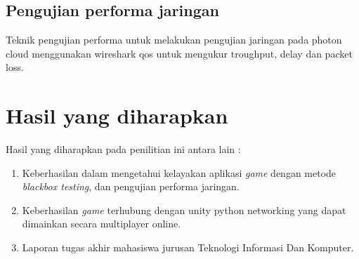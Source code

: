 \subsection{Pengujian performa jaringan}
Teknik pengujian performa untuk melakukan pengujian jaringan pada photon cloud menggunakan wireshark qos untuk mengukur troughput, delay dan packet loss.
\section{Hasil yang diharapkan}
Hasil yang diharapkan pada penilitian ini antara lain :
\begin{enumerate}
    \item Keberhasilan dalam mengetahui kelayakan aplikasi \textit{game} dengan metode \textit{blackbox testing}, dan pengujian performa jaringan.
    \item Keberhasilan \textit{game} terhubung dengan unity python networking yang dapat dimainkan secara multiplayer online.
    \item Laporan tugas akhir mahasiswa jurusan Teknologi Informasi Dan Komputer.
\end{enumerate}